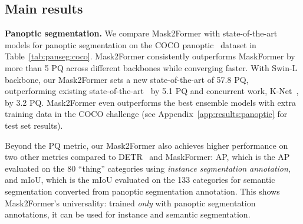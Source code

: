 \documentclass[10pt,twocolumn,letterpaper]{article}
\newcommand{\modelname}{Mask2Former\xspace}
\newcommand{\tabref}[1]{Table~\ref{#1}}
\newcommand{\appref}[1]{Appendix~\ref{#1}}
\begin{document}
\subsection{Main results}

\noindent\textbf{Panoptic segmentation.} We compare \modelname with state-of-the-art models for panoptic segmentation on the COCO panoptic~\cite{kirillov2017panoptic} dataset in \tabref{tab:panseg:coco}. \modelname consistently outperforms MaskFormer by more than 5 PQ across different backbones while converging  faster. With Swin-L backbone,
our \modelname sets a new state-of-the-art of 57.8 PQ, outperforming existing state-of-the-art~\cite{cheng2021maskformer} by 5.1 PQ and concurrent work, K-Net~\cite{zhang2021knet}, by 3.2 PQ.
\modelname even outperforms the best ensemble models with extra training data in the COCO challenge (see \appref{app:results:panoptic} for test set results).

Beyond the PQ metric, our \modelname also achieves higher performance on two other metrics compared to DETR~\cite{detr} and MaskFormer: AP, which is the AP evaluated on the 80 ``thing'' categories using \emph{instance segmentation annotation}, and mIoU, which is the mIoU evaluated on the 133 categories for semantic segmentation converted from panoptic segmentation annotation. This shows \modelname's universality: trained \emph{only} with panoptic segmentation annotations, it can be used for instance and semantic segmentation.
\end{document}
